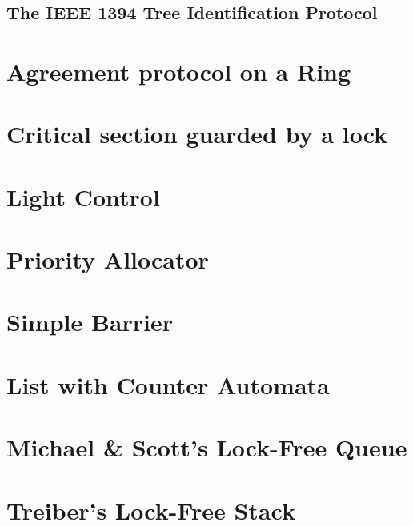 \subsection{The IEEE 1394 Tree Identification Protocol}
\ifnoexperiments\else\fi

\section{Agreement protocol on a Ring}
\ifnoexperiments\else\fi

\newpage
\section{Critical section guarded by a lock}
\ifnoexperiments\else\fi

\section{Light Control}
\ifnoexperiments\else\fi

\section{Priority Allocator}
\ifnoexperiments\else\fi

\section{Simple Barrier}
\ifnoexperiments\else\fi

\section{List with Counter Automata}
\ifnoexperiments\else\fi

\section{Michael \& Scott's Lock-Free Queue}
\ifnoexperiments\else\fi

\section{Treiber's Lock-Free Stack}
\ifnoexperiments\else\fi

